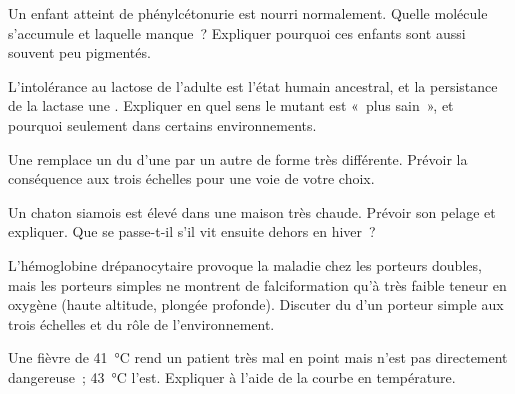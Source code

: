 \begin{exercise}[$\star\star$]\label{exo:g11:enzymes-and-phenotype:8}
Un enfant atteint de phénylcétonurie est nourri normalement. Quelle
molécule s'accumule et laquelle manque~? Expliquer pourquoi ces enfants
sont aussi souvent peu pigmentés.
\end{exercise}

\begin{exercise}[$\star\star$]\label{exo:g11:enzymes-and-phenotype:9}
L'intolérance au lactose de l'adulte est l'état humain ancestral, et la
persistance de la lactase une . Expliquer en quel sens le
 mutant est «~plus sain~», et pourquoi seulement dans
certains environnements.
\end{exercise}

\begin{exercise}[$\star\star$]\label{exo:g11:enzymes-and-phenotype:10}
Une  remplace un  du  d'une  par un
autre de forme très différente. Prévoir la conséquence aux trois
échelles pour une voie de votre choix.
\end{exercise}

\begin{exercise}[$\star\star$]\label{exo:g11:enzymes-and-phenotype:11}
Un chaton siamois est élevé dans une maison très chaude. Prévoir son
pelage et expliquer. Que se passe-t-il s'il vit ensuite dehors en
hiver~?
\end{exercise}

\begin{exercise}[$\star\star\star$]\label{exo:g11:enzymes-and-phenotype:12}
L'hémoglobine drépanocytaire provoque la maladie chez les porteurs
doubles, mais les porteurs simples ne montrent de falciformation qu'à
très faible teneur en oxygène (haute altitude, plongée profonde).
Discuter du  d'un porteur simple aux trois échelles et du rôle
de l'environnement.
\end{exercise}

\begin{exercise}[$\star\star\star$]\label{exo:g11:enzymes-and-phenotype:13}
Une fièvre de \qty{41}{\celsius} rend un patient très mal en point mais
n'est pas directement dangereuse~; \qty{43}{\celsius} l'est. Expliquer
à l'aide de la courbe en température.
\end{exercise}


